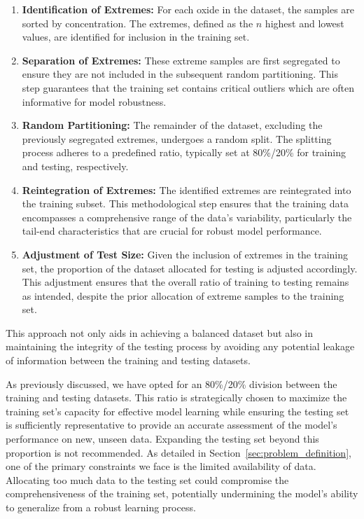 \begin{enumerate}
    \item \textbf{Identification of Extremes:} For each oxide in the dataset, the samples are sorted by concentration. The extremes, defined as the $n$ highest and lowest values, are identified for inclusion in the training set.
    \item \textbf{Separation of Extremes:} These extreme samples are first segregated to ensure they are not included in the subsequent random partitioning. This step guarantees that the training set contains critical outliers which are often informative for model robustness.
    \item \textbf{Random Partitioning:} The remainder of the dataset, excluding the previously segregated extremes, undergoes a random split. The splitting process adheres to a predefined ratio, typically set at 80\%/20\% for training and testing, respectively.
    \item \textbf{Reintegration of Extremes:} The identified extremes are reintegrated into the training subset. This methodological step ensures that the training data encompasses a comprehensive range of the data's variability, particularly the tail-end characteristics that are crucial for robust model performance.
    \item \textbf{Adjustment of Test Size:} Given the inclusion of extremes in the training set, the proportion of the dataset allocated for testing is adjusted accordingly. This adjustment ensures that the overall ratio of training to testing remains as intended, despite the prior allocation of extreme samples to the training set.
\end{enumerate}

This approach not only aids in achieving a balanced dataset but also in maintaining the integrity of the testing process by avoiding any potential leakage of information between the training and testing datasets.


As previously discussed, we have opted for an 80\%/20\% division between the training and testing datasets.
This ratio is strategically chosen to maximize the training set's capacity for effective model learning while ensuring the testing set is sufficiently representative to provide an accurate assessment of the model's performance on new, unseen data.
Expanding the testing set beyond this proportion is not recommended.
As detailed in Section~\ref{sec:problem_definition}, one of the primary constraints we face is the limited availability of data.
Allocating too much data to the testing set could compromise the comprehensiveness of the training set, potentially undermining the model's ability to generalize from a robust learning process.


